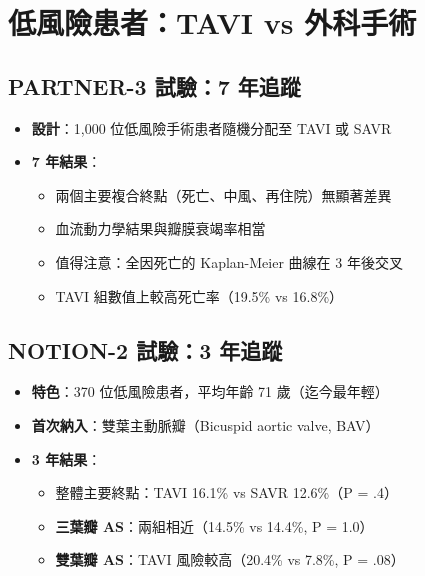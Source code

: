 \documentclass[12pt,a4paper]{article}
\begin{document}

\section{低風險患者：TAVI vs 外科手術}

\subsection{PARTNER-3 試驗：7 年追蹤}

\begin{itemize}
    \item \textbf{設計}：1,000 位低風險手術患者隨機分配至 TAVI 或 SAVR
    \item \textbf{7 年結果}：
    \begin{itemize}
        \item 兩個主要複合終點（死亡、中風、再住院）無顯著差異
        \item 血流動力學結果與瓣膜衰竭率相當
        \item 值得注意：全因死亡的 Kaplan-Meier 曲線在 3 年後交叉
        \item TAVI 組數值上較高死亡率（19.5\% vs 16.8\%）
    \end{itemize}
\end{itemize}

\subsection{NOTION-2 試驗：3 年追蹤}

\begin{itemize}
    \item \textbf{特色}：370 位低風險患者，平均年齡 71 歲（迄今最年輕）
    \item \textbf{首次納入}：雙葉主動脈瓣（Bicuspid aortic valve, BAV）
    \item \textbf{3 年結果}：
    \begin{itemize}
        \item 整體主要終點：TAVI 16.1\% vs SAVR 12.6\%（P = .4）
        \item \textbf{三葉瓣 AS}：兩組相近（14.5\% vs 14.4\%, P = 1.0）
        \item \textbf{雙葉瓣 AS}：TAVI 風險較高（20.4\% vs 7.8\%, P = .08）
    \end{itemize}
\end{itemize}
\end{document}
